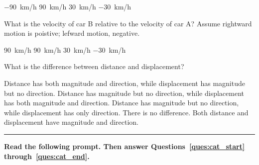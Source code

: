 \documentclass[answers]{exam}
\begin{document}
\begin{questions}
\begin{randomizechoices}
    \correctchoice \SI{-90}{km/h}
    \choice \SI{90}{km/h}
    \choice \SI{30}{km/h}
    \choice \SI{-30}{km/h}
\end{randomizechoices}

\question
What is the velocity of car B relative to the velocity of car A? Assume rightward motion is poistive; lefward motion, negative.

\begin{center}
\end{center}

\begin{randomizechoices}
    \choice \SI{90}{km/h}
    \correctchoice \SI{90}{km/h}
    \choice \SI{30}{km/h}
    \choice \SI{-30}{km/h}
\end{randomizechoices}

\begin{questions}
\printanswers


\question %
What is the difference between distance and displacement?

\begin{choices}
\choice Distance has both magnitude and direction, while displacement has magnitude but no direction.
\CorrectChoice Distance has magnitude but no direction, while displacement has both magnitude and direction.
\choice Distance has magnitude but no direction, while displacement has only direction.
\choice There is no difference. Both distance and displacement have magnitude and direction.
\end{choices}

\vspace{1em} \hrule 

\begin{EnvUplevel}
\textbf{Read the following prompt. Then answer Questions~\ref{ques:cat_start} through~\ref{ques:cat_end}.}


\end{EnvUplevel}
\end{questions}
\end{questions}
\end{document}
